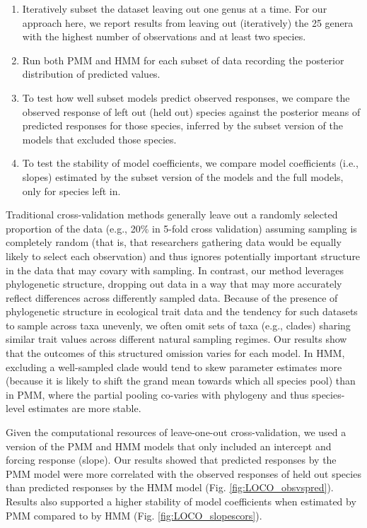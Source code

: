 \documentclass[11pt]{article}
\begin{document}
\begin{enumerate}
\item Iteratively subset the dataset leaving out one genus at a time. For our approach here, we report results from leaving out (iteratively) the 25 genera with the highest number of observations and at least two species. 
\item Run both PMM and HMM for each subset of data recording the posterior distribution of predicted values. 
\item To test how well subset models predict observed responses, we compare the observed response of left out (held out) species against the posterior means of predicted responses for those species, inferred by the subset version of the models that excluded those species. 
\item To test the stability of model coefficients, we compare model coefficients (i.e., slopes) estimated by the subset version of the models and the full models, only for species left in.
\end{enumerate} 

Traditional cross-validation methods generally leave out a randomly selected proportion of the data (e.g., 20\% in 5-fold cross validation) assuming sampling is completely random (that is, that researchers gathering data would be equally likely to select each observation) and thus ignores potentially important structure in the data that may covary with sampling. In contrast, our method leverages phylogenetic structure, dropping out data in a way that may more accurately reflect differences across differently sampled data. Because of the presence of phylogenetic structure in ecological trait data and the tendency for such datasets to sample across taxa unevenly, we often omit sets of taxa (e.g., clades) sharing similar trait values across different natural sampling regimes. Our results show that the outcomes of this structured omission varies for each model. In HMM, excluding a well-sampled clade would tend to skew parameter estimates more (because it is likely to shift the grand mean towards which all species pool) than in PMM, where the partial pooling co-varies with phylogeny and thus species-level estimates are more stable. 

Given the computational resources of leave-one-out  cross-validation, we used a version of the PMM and HMM models that only included an intercept and forcing response (slope). Our results showed that predicted responses by the PMM model were more correlated with the observed responses of held out species than predicted responses by the HMM model (Fig. \ref{fig:LOCO_obsvspred}). Results also supported a higher stability of model coefficients when estimated by PMM compared to by HMM (Fig. \ref{fig:LOCO_slopescors}). 
\end{document}
